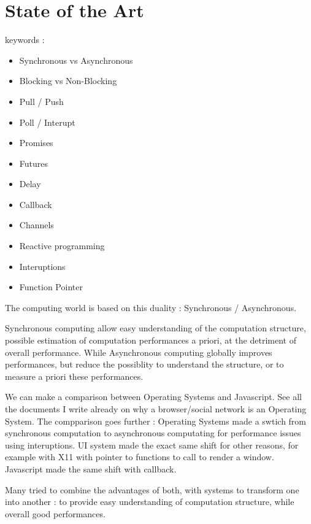 \section{State of the Art}

keywords :

\begin{itemize}
	\item Synchronous vs Asynchronous
	\item Blocking vs Non-Blocking
	\item Pull / Push
	\item Poll / Interupt

	\item Promises
	\item Futures
	\item Delay
	\item Callback
	\item Channels
	
	\item Reactive programming

	\item Interuptions
	\item Function Pointer
\end{itemize}


The computing world is based on this duality : Synchronous / Asynchronous.

Synchronous computing allow easy understanding of the computation structure, possible estimation of computation performances a priori, at the detriment of overall performance.
While Asynchronous computing globally improves performances, but reduce the possiblity to understand the structure, or to measure a priori these performances.

We can make a comparison between Operating Systems and Javascript.
See all the documents I write already on why a browser/social network is an Operating System.
The compparison goes further : Operating Systems made a swtich from synchronous computation to asynchronous computating for performance issues using interuptions.
UI system made the exact same shift for other reasons, for example with X11 with pointer to functions to call to render a window.
Javascript made the same shift with callback.


Many tried to combine the advantages of both, with systems to transform one into another : to provide easy understanding of computation structure, while overall good performances.


